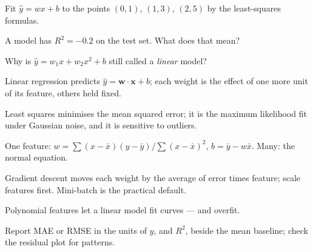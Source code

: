 \begin{checkpoint}
\begin{tightnum}
  \item Fit $\hat{y} = wx + b$ to the points $(0, 1)$, $(1, 3)$, $(2, 5)$ by
        the least-squares formulas.
  \item A model has $R^2 = -0.2$ on the test set. What does that mean?
  \item Why is $\hat{y} = w_1 x + w_2 x^2 + b$ still called a \emph{linear} model?
\end{tightnum}
\end{checkpoint}

\begin{chaptersummary}
\begin{tight}
  \item Linear regression predicts $\hat{y} = \mathbf{w}\cdot\mathbf{x} + b$; each
        weight is the effect of one more unit of its feature, others held fixed.
  \item Least squares minimises the mean squared error; it is the maximum
        likelihood fit under Gaussian noise, and it is sensitive to outliers.
  \item One feature: $w = \sum(x-\bar{x})(y-\bar{y}) / \sum(x-\bar{x})^2$,
        $b = \bar{y} - w\bar{x}$. Many: the normal equation.
  \item Gradient descent moves each weight by the average of error times feature;
        scale features first. Mini-batch is the practical default.
  \item Polynomial features let a linear model fit curves --- and overfit.
  \item Report MAE or RMSE in the units of $y$, and $R^2$, beside the
        mean baseline; check the residual plot for patterns.
\end{tight}
\end{chaptersummary}

